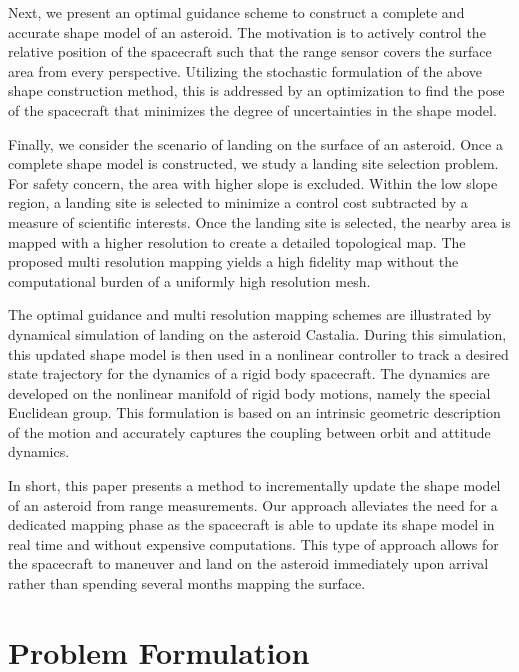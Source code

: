 \documentclass[smallextended]{svjour3}       %
\begin{document}
Next, we present an optimal guidance scheme to construct a complete and accurate shape model of an asteroid. 
The motivation is to actively control the relative position of the spacecraft such that the range sensor covers the surface area from every perspective. 
Utilizing the stochastic formulation of the above shape construction method, this is addressed by an optimization to find the pose of the spacecraft that minimizes the degree of uncertainties in the shape model. 

Finally, we consider the scenario of landing on the surface of an asteroid. 
Once a complete shape model is constructed, we study a landing site selection problem. 
For safety concern, the area with higher slope is excluded. 
Within the low slope region, a landing site is selected to minimize a control cost subtracted by a measure of scientific interests. 
Once the landing site is selected, the nearby area is mapped with a higher resolution to create a detailed topological map.  
The proposed multi resolution mapping yields a high fidelity map without the computational burden of a uniformly high resolution mesh.  

The optimal guidance and multi resolution mapping schemes are illustrated by dynamical simulation of landing on the asteroid Castalia. 
During this simulation, this updated shape model is then used in a nonlinear controller to track a desired state trajectory for the dynamics of a rigid body spacecraft.
The dynamics are developed on the nonlinear manifold of rigid body motions, namely the special Euclidean group.
This formulation is based on an intrinsic geometric description of the motion and accurately captures the coupling between orbit and attitude dynamics. 


In short, this paper presents a method to incrementally update the shape  model of an asteroid from range measurements. 
Our approach alleviates the need for a dedicated mapping phase as the spacecraft is able to update its shape model in real time and without expensive computations.
This type of approach allows for the spacecraft to maneuver and land on the asteroid immediately upon arrival rather than spending several months mapping the surface.

\section{Problem Formulation}\label{sec:problem}
\end{document}
